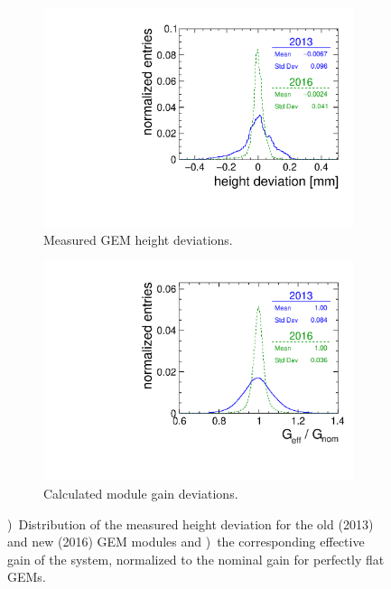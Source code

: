 \begin{figure}[tbhp!]
\begin{subfigure}[b]{0.5\textwidth}
\includegraphics[width=\textwidth]{Tracker/TPC_Bonn/plots/TPC-DG_GEMHeightDistAll2013_2016comb_intnorm.pdf}
\caption{Measured GEM height deviations.}
\label{sfig:GEMheight}
\end{subfigure}%
\begin{subfigure}[b]{0.5\textwidth}
\includegraphics[width=\textwidth]{Tracker/TPC_Bonn/plots/TPC-DG_effectiveGainDistributionAll2013_2016comb_intnorm.pdf}
\caption{Calculated module gain deviations.}
\label{sfig:GEMeffGain}
\end{subfigure}
\caption{\protect{})~Distribution of the measured height deviation for the old (2013) and new (2016) GEM modules and \protect{})~the corresponding effective gain of the system, normalized to the nominal gain for perfectly flat GEMs.}
\label{fig:GEMheight}
\end{figure}

